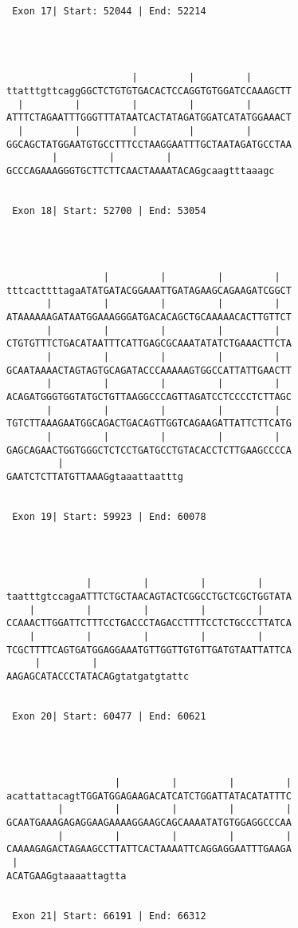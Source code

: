 \documentclass{article}
\begin{document}
\begin{Verbatim}
 Exon 17| Start: 52044 | End: 52214 




                      |         |         |       
ttatttgttcaggGGCTCTGTGTGACACTCCAGGTGTGGATCCAAAGCTT
  |         |         |         |         |       
ATTTCTAGAATTTGGGTTTATAATCACTATAGATGGATCATATGGAAACT
  |         |         |         |         |       
GGCAGCTATGGAATGTGCCTTTCCTAAGGAATTTGCTAATAGATGCCTAA
        |         |         |     
GCCCAGAAAGGGTGCTTCTTCAACTAAAATACAGgcaagtttaaagc


 Exon 18| Start: 52700 | End: 53054 




                 |         |         |         |  
tttcacttttagaATATGATACGGAAATTGATAGAAGCAGAAGATCGGCT
       |         |         |         |         |  
ATAAAAAAGATAATGGAAAGGGATGACACAGCTGCAAAAACACTTGTTCT
       |         |         |         |         |  
CTGTGTTTCTGACATAATTTCATTGAGCGCAAATATATCTGAAACTTCTA
       |         |         |         |         |  
GCAATAAAACTAGTAGTGCAGATACCCAAAAAGTGGCCATTATTGAACTT
       |         |         |         |         |  
ACAGATGGGTGGTATGCTGTTAAGGCCCAGTTAGATCCTCCCCTCTTAGC
       |         |         |         |         |  
TGTCTTAAAGAATGGCAGACTGACAGTTGGTCAGAAGATTATTCTTCATG
       |         |         |         |         |  
GAGCAGAACTGGTGGGCTCTCCTGATGCCTGTACACCTCTTGAAGCCCCA
         |        
GAATCTCTTATGTTAAAGgtaaattaatttg


 Exon 19| Start: 59923 | End: 60078 




              |         |         |         |     
taatttgtccagaATTTCTGCTAACAGTACTCGGCCTGCTCGCTGGTATA
    |         |         |         |         |     
CCAAACTTGGATTCTTTCCTGACCCTAGACCTTTTCCTCTGCCCTTATCA
    |         |         |         |         |     
TCGCTTTTCAGTGATGGAGGAAATGTTGGTTGTGTTGATGTAATTATTCA
     |         |   
AAGAGCATACCCTATACAGgtatgatgtattc


 Exon 20| Start: 60477 | End: 60621 




                   |         |         |         |
acattattacagtTGGATGGAGAAGACATCATCTGGATTATACATATTTC
         |         |         |         |         |
GCAATGAAAGAGAGGAAGAAAAGGAAGCAGCAAAATATGTGGAGGCCCAA
         |         |         |         |         |
CAAAAGAGACTAGAAGCCTTATTCACTAAAATTCAGGAGGAATTTGAAGA
 |      
ACATGAAGgtaaaattagtta


 Exon 21| Start: 66191 | End: 66312 





\end{Verbatim}
\end{document}

